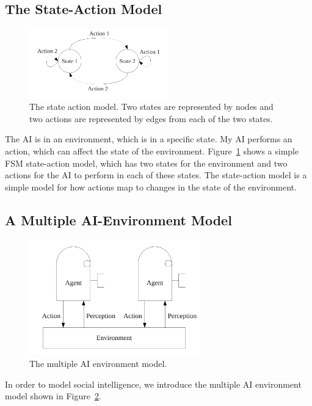 \subsection{The State-Action Model}
\label{sec:state_action_model}

\begin{figure}[bth]
  \center
  \includegraphics[width=6cm]{gfx/state_action}
  \caption[The state-action model]{The state action model.  Two states
    are represented by nodes and two actions are represented by edges
    from each of the two states.}
  \label{fig:state_action}
\end{figure}

The AI is in an environment, which is in a specific state.  My
AI performs an action, which can affect the state of the
environment.  Figure~\ref{fig:state_action} shows a simple \ac{FSM}
state-action model, which has two states for the environment and two
actions for the AI to perform in each of these states.  The
state-action model is a simple model for how actions map to changes in
the state of the environment.


\subsection{A Multiple AI-Environment Model}

\begin{figure}[bth]
  \center
  \includegraphics[height=5cm]{gfx/multiple_agent_environment}
  \caption[The multiple AI environment model]{The multiple AI environment model.}
  \label{fig:multiple_agent_environment}
\end{figure}

In order to model social intelligence, we introduce the multiple AI
environment model shown in
Figure~\ref{fig:multiple_agent_environment}.


